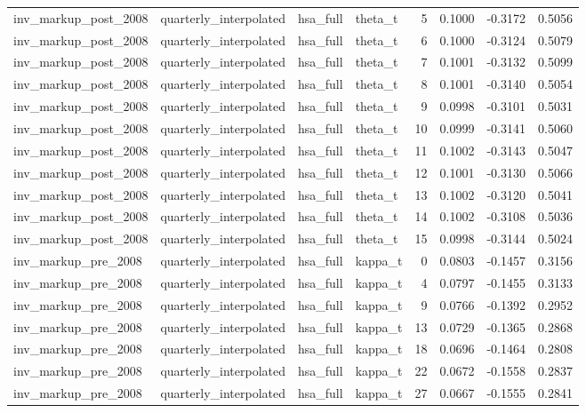 \begin{tabular}{llllrrrr}
inv\_markup\_post\_2008 & quarterly\_interpolated & hsa\_full & theta\_t & 5 & 0.1000 & -0.3172 & 0.5056 \\
inv\_markup\_post\_2008 & quarterly\_interpolated & hsa\_full & theta\_t & 6 & 0.1000 & -0.3124 & 0.5079 \\
inv\_markup\_post\_2008 & quarterly\_interpolated & hsa\_full & theta\_t & 7 & 0.1001 & -0.3132 & 0.5099 \\
inv\_markup\_post\_2008 & quarterly\_interpolated & hsa\_full & theta\_t & 8 & 0.1001 & -0.3140 & 0.5054 \\
inv\_markup\_post\_2008 & quarterly\_interpolated & hsa\_full & theta\_t & 9 & 0.0998 & -0.3101 & 0.5031 \\
inv\_markup\_post\_2008 & quarterly\_interpolated & hsa\_full & theta\_t & 10 & 0.0999 & -0.3141 & 0.5060 \\
inv\_markup\_post\_2008 & quarterly\_interpolated & hsa\_full & theta\_t & 11 & 0.1002 & -0.3143 & 0.5047 \\
inv\_markup\_post\_2008 & quarterly\_interpolated & hsa\_full & theta\_t & 12 & 0.1001 & -0.3130 & 0.5066 \\
inv\_markup\_post\_2008 & quarterly\_interpolated & hsa\_full & theta\_t & 13 & 0.1002 & -0.3120 & 0.5041 \\
inv\_markup\_post\_2008 & quarterly\_interpolated & hsa\_full & theta\_t & 14 & 0.1002 & -0.3108 & 0.5036 \\
inv\_markup\_post\_2008 & quarterly\_interpolated & hsa\_full & theta\_t & 15 & 0.0998 & -0.3144 & 0.5024 \\
inv\_markup\_pre\_2008 & quarterly\_interpolated & hsa\_full & kappa\_t & 0 & 0.0803 & -0.1457 & 0.3156 \\
inv\_markup\_pre\_2008 & quarterly\_interpolated & hsa\_full & kappa\_t & 4 & 0.0797 & -0.1455 & 0.3133 \\
inv\_markup\_pre\_2008 & quarterly\_interpolated & hsa\_full & kappa\_t & 9 & 0.0766 & -0.1392 & 0.2952 \\
inv\_markup\_pre\_2008 & quarterly\_interpolated & hsa\_full & kappa\_t & 13 & 0.0729 & -0.1365 & 0.2868 \\
inv\_markup\_pre\_2008 & quarterly\_interpolated & hsa\_full & kappa\_t & 18 & 0.0696 & -0.1464 & 0.2808 \\
inv\_markup\_pre\_2008 & quarterly\_interpolated & hsa\_full & kappa\_t & 22 & 0.0672 & -0.1558 & 0.2837 \\
inv\_markup\_pre\_2008 & quarterly\_interpolated & hsa\_full & kappa\_t & 27 & 0.0667 & -0.1555 & 0.2841 \\

\end{tabular}
